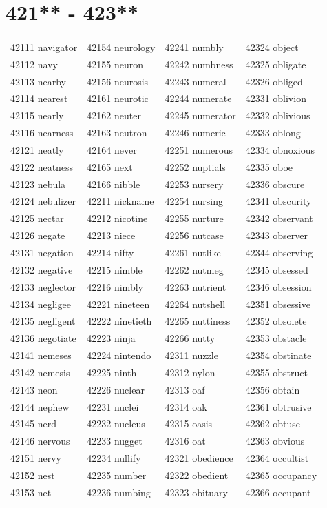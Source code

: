 \documentclass[10pt, oneside]{book}
\begin{document}
\begin{table}
	\centering
	\section*{421** - 423**}
	\begin{tabular}{l l l l}
42111 navigator &42154 neurology &42241 numbly &42324 object\\
42112 navy &42155 neuron &42242 numbness &42325 obligate\\
42113 nearby &42156 neurosis &42243 numeral &42326 obliged\\
42114 nearest &42161 neurotic &42244 numerate &42331 oblivion\\
42115 nearly &42162 neuter &42245 numerator &42332 oblivious\\
42116 nearness &42163 neutron &42246 numeric &42333 oblong\\
42121 neatly &42164 never &42251 numerous &42334 obnoxious\\
42122 neatness &42165 next &42252 nuptials &42335 oboe\\
42123 nebula &42166 nibble &42253 nursery &42336 obscure\\
42124 nebulizer &42211 nickname &42254 nursing &42341 obscurity\\
42125 nectar &42212 nicotine &42255 nurture &42342 observant\\
42126 negate &42213 niece &42256 nutcase &42343 observer\\
42131 negation &42214 nifty &42261 nutlike &42344 observing\\
42132 negative &42215 nimble &42262 nutmeg &42345 obsessed\\
42133 neglector &42216 nimbly &42263 nutrient &42346 obsession\\
42134 negligee &42221 nineteen &42264 nutshell &42351 obsessive\\
42135 negligent &42222 ninetieth &42265 nuttiness &42352 obsolete\\
42136 negotiate &42223 ninja &42266 nutty &42353 obstacle\\
42141 nemeses &42224 nintendo &42311 nuzzle &42354 obstinate\\
42142 nemesis &42225 ninth &42312 nylon &42355 obstruct\\
42143 neon &42226 nuclear &42313 oaf &42356 obtain\\
42144 nephew &42231 nuclei &42314 oak &42361 obtrusive\\
42145 nerd &42232 nucleus &42315 oasis &42362 obtuse\\
42146 nervous &42233 nugget &42316 oat &42363 obvious\\
42151 nervy &42234 nullify &42321 obedience &42364 occultist\\
42152 nest &42235 number &42322 obedient &42365 occupancy\\
42153 net &42236 numbing &42323 obituary &42366 occupant\\
	\end{tabular}
 \end{table}
\clearpage
\end{document}
